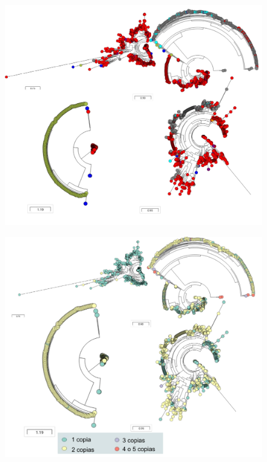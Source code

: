 \documentclass[12pt,twoside]{reedthesis}
\begin{document}
  \begin{figure}[h!tbp]
  \centering
  \includegraphics[angle = 0,scale = 1]{chapter4/PriAEvoMining.pdf}
  \caption[Árboles de destino metabólico de PriA en Actinobacteria, Cyanobacteria, Pseudomonas y Archaea según EvoMining]{\footnotesize{}}
  \label{fig:PriAExpansions}
  \end{figure}
  
  \begin{figure}[h!tbp]
  \centering
  \includegraphics[angle = 0,scale = 0.8]{chapter4/PriAEvoMiningCopies.pdf}
  \caption[Copias extras de PriA en Actinobacteria, Cyanobacteria, Pseudomonas y Archaea]{\footnotesize{}}
  \label{fig:PriAEvoMiningCopies}
  \end{figure}
  
\end{document}
